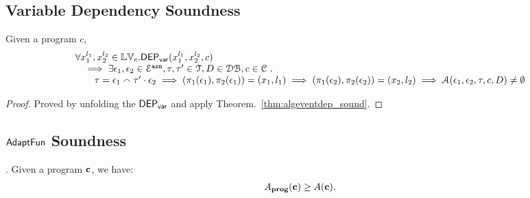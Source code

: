 %
\subsection{Variable Dependency Soundness}
\begin{thm}
\label{thm:algvardep_sound}
Given a program ${c}$, 
\[
\begin{array}{l}
  \forall {x}_1^{l_1}, {x}_2^{l_2} \in \mathbb{LV}_{{c}}.
  \mathsf{DEP_{var}}({x}_1^{l_1}, {x}_2^{l_2}, {c})
  \\ \quad \implies \exists \mathtt{\epsilon}_1, \mathtt{\epsilon}_2 \in \mathcal{E}^{\mathtt{{asn}}}, \mathtt{\tau}, \mathtt{\tau}'  \in \mathcal{T}, D \in \mathcal{DB} , c \in \mathcal{C} ~.~
  \\ \qquad
 \mathtt{\tau} = \mathtt{\epsilon}_1 \smallfrown \mathtt{\tau}' \cdot \mathtt{\epsilon}_2
   \implies 
  (\pi_{1}{(\mathtt{\epsilon}_1)}, \pi_{2}{(\mathtt{\epsilon}_1)}) = ({x}_1, l_1)
\implies
(\pi_{1}{(\mathtt{\epsilon}_2)}, \pi_{2}{(\mathtt{\epsilon}_2)}) = ({x}_2, l_2)
\implies
  \mathcal{A}(\mathtt{\epsilon}_1, \mathtt{\epsilon}_2, \mathtt{\tau}, c, D) \neq \emptyset
\end{array}
\]
\end{thm}
\begin{proof}
Proved by unfolding the $\mathsf{DEP_{var}}$ and apply Theorem.~\ref{thm:algeventdep_sound}.
\end{proof}
%

\subsection{$\textsf{AdaptFun}$ Soundness}
{
  \begin{thm}.
  Given a program ${\boldsymbol{\mathbf{c}}}$, we have:
  \[
  A_{\bf{prog}}({\boldsymbol{\mathbf{c}}}) \geq A({\boldsymbol{\mathbf{c}}}).
  \]
  \end{thm}
}

